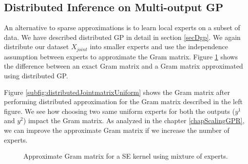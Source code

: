 \subsection{Distributed Inference on Multi-output GP}\label{sec:dMOGP}
An alternative to sparse approximations is to learn local experts on a subset of data. We have described distributed GP in detail in section \ref{secDgp}. We again distribute our dataset $X_{joint}$ into smaller experts and use the independence assumption between experts to approximate the Gram matrix.  Figure \ref{figDGPMTGP} shows the difference between an exact Gram matrix and a Gram matrix approximated using distributed GP.

Figure \ref{subfig:distributedJointmatrixUniform} shows the Gram matrix after performing distributed approximation for the Gram matrix described in the left figure. We see how choosing two same uniform experts for both the outputs ($y^1$ and $y^2$) impact the Gram matrix. As analyzed in the chapter \ref{chapScalingGPR}, we can improve the approximate Gram matrix if we increase the number of experts. 

\begin{figure}[!ht]
  \centering
  \quad
  \caption{Approximate Gram matrix for a SE kernel using mixture of experts.}
  \label{figDGPMTGP}
\end{figure}

